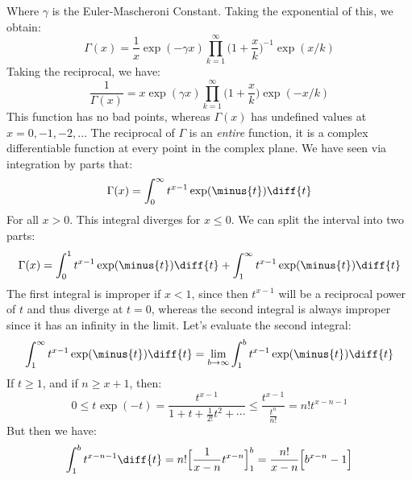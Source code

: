         Where $\gamma$ is the Euler-Mascheroni Constant. Taking
        the exponential of this, we obtain:
        \begin{equation}
            \Gamma(x)=\frac{1}{x}\exp(\minus\gamma{x})
                \prod_{k=1}^{\infty}\Big(1+\frac{x}{k}\Big)^{-1}
                    \exp(x/k)
        \end{equation}
        Taking the reciprocal, we have:
        \begin{equation}
            \frac{1}{\Gamma(x)}=
            x\exp(\gamma{x})
            \prod_{k=1}^{\infty}\Big(1+\frac{x}{k}\Big)
            \exp(\minus{x}/k)
        \end{equation}
        This function has no bad points, whereas $\Gamma(x)$ has
        undefined values at $x=0,\minus{1},\minus{2},\dots$
        The reciprocal of $\Gamma$ is an \textit{entire} function,
        it is a complex differentiable function at every point in
        the complex plane. We have seen via integration by parts
        that:
        \begin{equation}
            \Gamma(x)=\int_{0}^{\infty}t^{x-1}\exp(\minus{t})\diff{t}
        \end{equation}
        For all $x>0$. This integral diverges for $x\leq{0}$.
        We can split the interval into two parts:
        \begin{equation}
            \Gamma(x)=\int_{0}^{1}t^{x-1}\exp(\minus{t})\diff{t}+
                \int_{1}^{\infty}t^{x-1}\exp(\minus{t})\diff{t}
        \end{equation}
        The first integral is improper if $x<1$, since then
        $t^{x-1}$ will be a reciprocal power of $t$ and thus
        diverge at $t=0$, whereas the second integral is always
        improper since it has an infinity in the limit.
        Let's evaluate the second integral:
        \begin{equation}
            \int_{1}^{\infty}t^{x-1}\exp(\minus{t})\diff{t}
            =\underset{b\rightarrow\infty}{\lim}
            \int_{1}^{b}t^{x-1}\exp(\minus{t})\diff{t}
        \end{equation}
        If $t\geq{1}$, and if $n\geq{x}+1$, then:
        \begin{equation}
            0\leq{t}^{}\exp(\minus{t})=
            \frac{t^{x-1}}{1+t+\frac{1}{2!}t^{2}+\cdots}
            \leq\frac{t^{x-1}}{\frac{t^{n}}{n!}}
            =n!t^{x-n-1}
        \end{equation}
        But then we have:
        \begin{equation}
            \int_{1}^{b}t^{x-n-1}\diff{t}=
            n!\Big[\frac{1}{x-n}t^{x-n}\Big]_{1}^{b}
            =\frac{n!}{x-n}\Big[b^{x-n}-1\Big]
        \end{equation}
